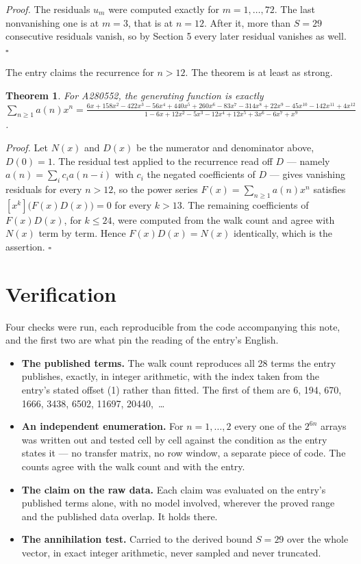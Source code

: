 \documentclass[11pt]{article}
\newtheorem{theorem}{Theorem}
\theoremstyle{definition}
\begin{document}
{\itshape Proof.} The residuals $u_m$ were computed exactly for $m = 1,\dots,72$. The last nonvanishing one is at $m = 3$, that is at $n = 12$. After it, more than $S = 29$ consecutive residuals vanish, so by Section 5 every later residual vanishes as well. $\square$

The entry claims the recurrence for $n > 12$. The theorem is at least as strong.

\begin{theorem} For A280552, the generating function is exactly $\sum_{n\ge 1} a(n)x^n = \frac{6x + 158x^{2} - 422x^{3} - 56x^{4} + 440x^{5} + 260x^{6} - 83x^{7} - 314x^{8} + 22x^{9} - 45x^{10} - 142x^{11} + 4x^{12}}{1 - 6x + 12x^{2} - 5x^{3} - 12x^{4} + 12x^{5} + 3x^{6} - 6x^{7} + x^{9}}$.\end{theorem}

{\itshape Proof.} Let $N(x)$ and $D(x)$ be the numerator and denominator above, $D(0)=1$. The residual test applied to the recurrence read off $D$ --- namely $a(n) = \sum_i c_i a(n-i)$ with $c_i$ the negated coefficients of $D$ --- gives vanishing residuals for every $n > 12$, so the power series $F(x)=\sum_{n\ge 1}a(n)x^n$ satisfies $[x^k]\bigl(F(x)D(x)\bigr) = 0$ for every $k > 13$. The remaining coefficients of $F(x)D(x)$, for $k \le 24$, were computed from the walk count and agree with $N(x)$ term by term. Hence $F(x)D(x) = N(x)$ identically, which is the assertion. $\square$

\section{Verification}

Four checks were run, each reproducible from the code accompanying this note, and the first two are what pin the reading of the entry's English.

\begin{itemize}

\item {\bfseries The published terms.} The walk count reproduces all 28 terms the entry publishes, exactly, in integer arithmetic, with the index taken from the entry's stated offset (1) rather than fitted. The first of them are 6, 194, 670, 1666, 3438, 6502, 11697, 20440,~\dots

\item {\bfseries An independent enumeration.} For $n = 1,\dots,2$ every one of the $2^{6n}$ arrays was written out and tested cell by cell against the condition as the entry states it --- no transfer matrix, no row window, a separate piece of code. The counts agree with the walk count and with the entry.

\item {\bfseries The claim on the raw data.} Each claim was evaluated on the entry's published terms alone, with no model involved, wherever the proved range and the published data overlap. It holds there.

\item {\bfseries The annihilation test.} Carried to the derived bound $S = 29$ over the whole vector, in exact integer arithmetic, never sampled and never truncated.

\end{itemize}
\end{document}
